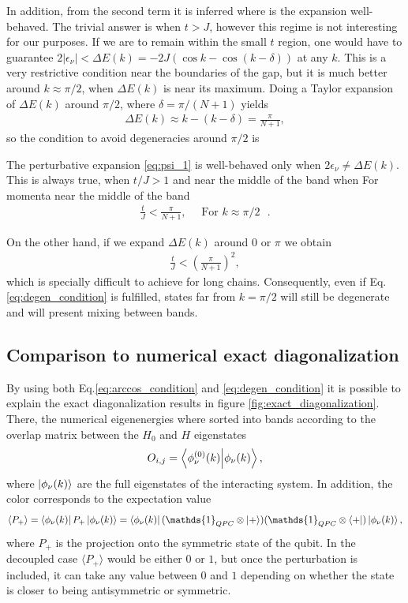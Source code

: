 \documentclass{article}
\newcommand{\Id}{\mathds{1}}
\begin{document}
In addition, from the second term it is inferred where is the expansion well-behaved. The trivial answer is when $t>J$, however this regime is not interesting for our purposes. If we are to remain within the small $t$ region, one would have to guarantee $2 |\epsilon_\nu| < \Delta E(k) = -2J(\cos k - \cos(k-\delta))$ at any $k$. This is a very restrictive condition near the boundaries of the gap, but it is much better around $k\approx \pi/2$, when $\Delta E(k)$ is near its maximum. Doing a Taylor expansion of $\Delta E(k)$ around $\pi/2$, where $\delta = \pi/(N+1)$ yields
\begin{align}
    \Delta E(k) \approx k - (k - \delta) = \frac{\pi}{N+1},
\end{align}
so the condition to avoid degeneracies around $\pi/2$ is
\begin{tcolorbox}[title=Band-Gap condition, colback=white, colframe=black]
    The perturbative expansion \eqref{eq:psi_1} is well-behaved only when $2\epsilon_\nu \neq \Delta E(k)$. This is always true, when $t/J>1$ and near the middle of the band when
    For momenta near the middle of the band
\begin{align}\label{eq:degen_condition}
    \frac{t}{J}<\frac{\pi}{N+1}, \quad \text{ For $k\approx\pi/2$ }.
\end{align}
\end{tcolorbox}

On the other hand, if we expand $\Delta E(k)$ around $0$ or $\pi$ we obtain
\begin{align}
    \frac{t}{J}<\left(\frac{\pi}{N+1}\right)^2,
\end{align}
which is specially difficult to achieve for long chains.  Consequently, even if Eq.\eqref{eq:degen_condition} is fulfilled, states far from $k=\pi/2$ will still be degenerate and will present mixing between bands.

\subsection{Comparison to numerical exact diagonalization}

By using both Eq.\eqref{eq:arccos_condition} and \eqref{eq:degen_condition} it is possible to explain the exact diagonalization results in figure \ref{fig:exact_diagonalization}. There, the numerical eigenenergies where sorted into bands according to the overlap matrix between the $H_0$ and $H$ eigenstates
\begin{align}
    O_{i,j} = \bra{\phi_\nu^{(0)}(k)}\ket{\phi_\nu(k)},
\end{align}
where $\ket{\phi_\nu(k)}$ are the full eigenstates of the interacting system. In addition, the color corresponds to the expectation value
\begin{equation}
   \langle P_+\rangle= \bra{\phi_\nu (k)}P_{+}\ket{\phi_\nu (k)} = \bra{\phi_\nu (k)}(\Id_{QPC}\otimes\ket{+})(\Id_{QPC}\otimes\bra{+})\ket{\phi_\nu (k)},
\end{equation}
where $P_+$ is the projection onto the symmetric state of the qubit. In the decoupled case $\langle P_+\rangle$ would be either $0$ or $1$, but once the perturbation is included, it can take any value between $0$ and $1$ depending on whether the state is closer to being antisymmetric or symmetric.
\end{document}
